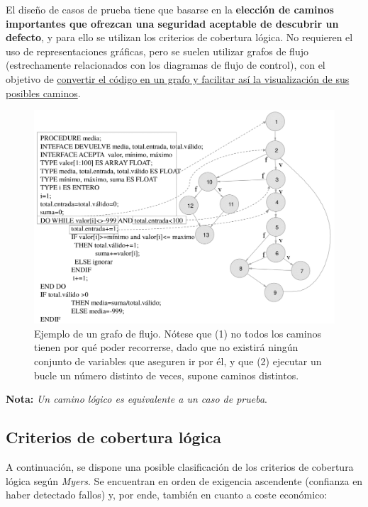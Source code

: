 El diseño de casos de prueba tiene que basarse en la \textbf{elección de caminos importantes que ofrezcan una seguridad aceptable de descubrir un defecto}, y para ello se utilizan los criterios de cobertura lógica. No requieren el uso de representaciones gráficas, pero se suelen utilizar grafos de flujo (estrechamente relacionados con los diagramas de flujo de control), con el objetivo de \uline{convertir el código en un grafo y facilitar así la visualización de sus posibles caminos}.

\begin{figure}[H]
    \centering
    \includegraphics[width=0.8\linewidth]{Resources/Tema6/Ejemplo_GrafoFlujo.png}
    \caption{Ejemplo de un grafo de flujo. Nótese que (1) no todos los caminos tienen por qué poder recorrerse, dado que no existirá ningún conjunto de variables que aseguren ir por él, y que (2) ejecutar un bucle un número distinto de veces, supone caminos distintos.}
\end{figure}

\textbf{Nota:} \textit{Un camino lógico es equivalente a un caso de prueba}.

\subsection{Criterios de cobertura lógica}

A continuación, se dispone una posible clasificación de los criterios de cobertura lógica según \textit{Myers}. Se encuentran en orden de exigencia ascendente (confianza en haber detectado fallos) y, por ende, también en cuanto a coste económico:

